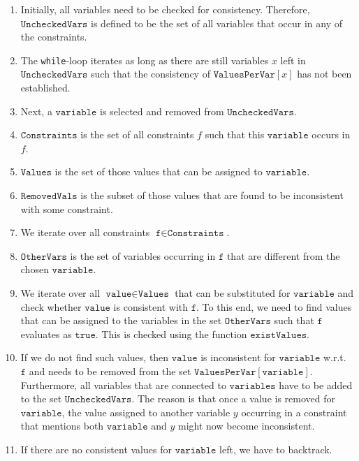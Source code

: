 \begin{enumerate}
\item Initially, all variables need to be checked for consistency.  Therefore, $\texttt{UncheckedVars}$
      is defined to be the set of all variables that occur in any of the constraints.
\item The \texttt{while}-loop iterates as long as there are still variables $x$ left in $\texttt{UncheckedVars}$
      such that the consistency of $\texttt{ValuesPerVar}[x]$ has not been established.
\item Next, a $\texttt{variable}$ is selected and removed from $\texttt{UncheckedVars}$. 
\item $\texttt{Constraints}$ is the set of all constraints $f$ such that this $\texttt{variable}$ occurs in $f$.
\item $\texttt{Values}$ is the set of those values that can be assigned to $\texttt{variable}$.
\item $\texttt{RemovedVals}$ is the subset of those values that are found to be inconsistent with some constraint.
\item We iterate over all constraints $\texttt{f} \in \texttt{Constraints}$.
\item $\texttt{OtherVars}$ is the set of variables occurring in $\texttt{f}$ that are different from 
      the chosen $\texttt{variable}$.
\item We iterate over all $\texttt{value} \in \texttt{Values}$ that can be substituted for $\texttt{variable}$
      and check whether $\texttt{value}$ is consistent with $\texttt{f}$.   To this end, we need to find values
      that can be assigned to the variables in the set $\texttt{OtherVars}$ such that $\texttt{f}$ evaluates as
      $\texttt{true}$.  This is checked using the function $\texttt{existValues}$.
\item If we do not find such values, then $\texttt{value}$ is inconsistent for
      $\texttt{variable}$ w.r.t.~$\texttt{f}$ and needs to be removed from the set 
      $\texttt{ValuesPerVar}[\texttt{variable}]$.  Furthermore, all variables that are connected to
      $\texttt{variables}$ have to be added to the set $\texttt{UncheckedVars}$.  The reason is that once a
      value is removed for $\texttt{variable}$, the value assigned to another variable $y$ occurring in a
      constraint that mentions both $\texttt{variable}$ and $y$ might now become inconsistent.
\item If there are no consistent values for $\texttt{variable}$ left, we have to backtrack.
\end{enumerate}

